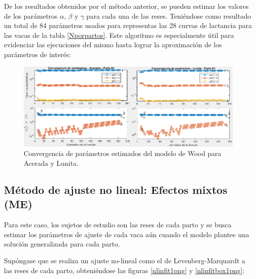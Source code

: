 De los resultados obtenidos por el método anterior, se pueden estimar los valores de los parámetros $\alpha$, $\beta$ y $\gamma$ para cada una de las reses. Teniéndose como resultado un total de 84 parámetros usados para representas las 28 curvas de lactancia para las vacas de la tabla \ref{Nporpartos}. Este algoritmo es especialmente útil para evidenciar las ejecuciones del mismo hasta lograr la aproximación de los parámetros de interés:

\begin{figure}[H]
	 \begin{center}
	 \includegraphics[scale=0.64]{img/parslev1.png}
	 \end{center}
	 \caption{Convergencia de parámetros estimados del modelo de Wood para Acerada y Lunita. \label{levenberg1}}
\end{figure}


\subsection{Método de ajuste no lineal: Efectos mixtos (ME)}

Para este caso, los sujetos de estudio son las reses de cada parto y se busca estimar los parámetros de ajuste de cada vaca aún cuando el modelo plantee una solución generalizada para cada parto.


Supóngase que se realiza un ajuste no-lineal como el de Levenberg-Marquardt a las reses de cada parto, obteniéndose las figuras \ref{nlinfit1png} y \ref{nlinfitbox1png}:

